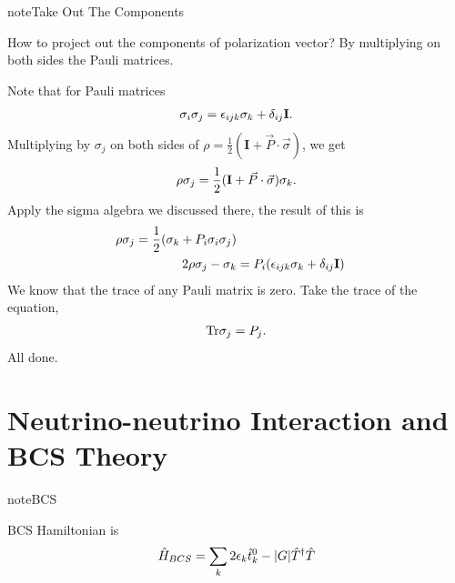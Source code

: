\documentclass[letterpaper,12pt,english]{sphinxmanual}
\begin{document}
\begin{notice}{note}{Take Out The Components}

How to project out the components of polarization vector? By multiplying on both sides the Pauli matrices.

Note that for Pauli matrices
\begin{gather}
\begin{split}\sigma_i \sigma_j = \epsilon_{ijk}\sigma_k + \delta_{ij}\mathbf I.\end{split}\notag
\end{gather}
Multiplying by \(\sigma_j\) on both sides of \(\rho =  \frac 1 2(\mathbf I+\vec P \cdot\vec \sigma)\), we get
\begin{gather}
\begin{split}\rho \sigma_j  = \frac 1 2(\mathbf I+\vec P \cdot\vec \sigma)\sigma_k.\end{split}\notag
\end{gather}
Apply the sigma algebra we discussed there, the result of this is
\begin{gather}
\begin{split}\rho \sigma_j = \frac{1}{2}(\sigma_k + P_i \sigma_i \sigma_j) \\
2 \rho \sigma_j - \sigma_k &= P_i (\epsilon_{ijk}\sigma_k + \delta_{ij}\mathbf I)\end{split}\notag
\end{gather}
We know that the trace of any Pauli matrix is zero. Take the trace of the equation,
\begin{gather}
\begin{split}\mathrm{Tr}\sigma_j =  P_j.\end{split}\notag
\end{gather}
All done.
\end{notice}


\section{Neutrino-neutrino Interaction and BCS Theory}
\label{picture:neutrino-neutrino-interaction-and-bcs-theory}
\begin{notice}{note}{BCS}

BCS Hamiltonian is
\begin{gather}
\begin{split}\hat H_{BCS} = \sum_k 2 \epsilon_k \hat t_k^0- \lvert G\rvert \hat T^\dagger \hat T\end{split}\notag
\end{gather}\end{notice}
\end{document}
